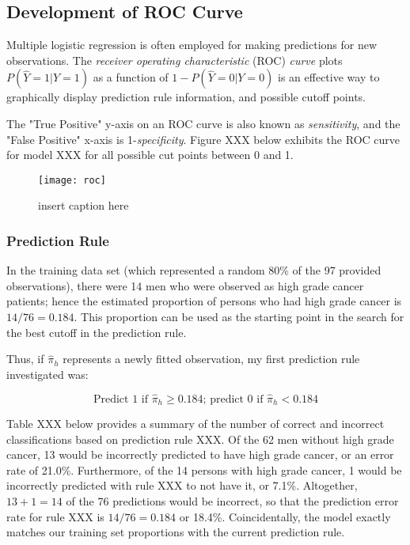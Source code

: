 \subsection{Development of ROC Curve}
Multiple logistic regression is often employed for making predictions for new observations.
The \textit{receiver operating characteristic} (ROC) \textit{curve} plots \(P(\hat{Y}=1 | Y=1)\) as a function of \(1-P(\hat{Y}=0 | Y=0)\) is an effective way to graphically display prediction rule information, and possible cutoff points. \par
The "True Positive" y-axis on an ROC curve is also known as \textit{sensitivity}, and the "False Positive" x-axis is 1-\textit{specificity}. Figure XXX below exhibits the ROC curve for model XXX for all possible cut points between 0 and 1.

\begin{figure}[H]
	\centering
	\texttt{[image: roc]}
	\caption{insert caption here}
\end{figure}

\subsubsection{Prediction Rule}
In the training data set (which represented a random 80\% of the 97 provided observations), there were 14 men who were observed as high grade cancer patients; hence the estimated proportion of persons who had high grade cancer is \(14/76=0.184\). This proportion can be used as the starting point in the search for the best cutoff in the prediction rule. \par
Thus, if \(\hat{\pi}_h\) represents a newly fitted observation, my first prediction rule investigated was:

\begin{equation}
	\textrm{Predict 1 if } \hat{\pi}_h \geq 0.184\textrm{; predict 0 if } \hat{\pi}_h < 0.184
\end{equation}

Table XXX below provides a summary of the number of correct and incorrect classifications based on prediction rule XXX. Of the 62 men without high grade cancer, 13 would be incorrectly predicted to have high grade cancer, or an error rate of 21.0\%. Furthermore, of the 14 persons with high grade cancer, 1 would be incorrectly predicted with rule XXX to not have it, or 7.1\%. Altogether, \(13+1=14\) of the 76 predictions would be incorrect, so that the prediction error rate for rule XXX is \(14/76=0.184\) or 18.4\%. Coincidentally, the model exactly matches our training set proportions with the current prediction rule. \par

